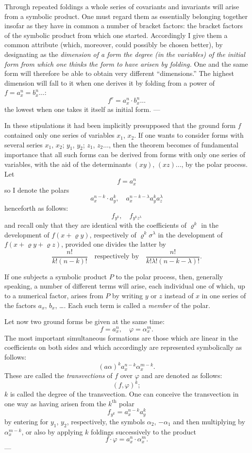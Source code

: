 \documentclass[10pt]{article}
\begin{document}
Through repeated foldings a whole series of covariants and invariants will arise from a symbolic product. One must regard them as essentially belonging together insofar as they have in common a number of bracket factors: the bracket factors of the symbolic product from which one started. Accordingly I give them a common attribute (which, moreover, could possibly be chosen better), by designating as the \emph{dimension of a form the degree (in the variables) of the initial form from which one thinks the form to have arisen by folding.} One and the same form will therefore be able to obtain very different ``dimensions.'' The highest dimension will fall to it when one derives it by folding from a power of $f=a_x^n=b_x^n\ldots$:
\[
f^r=a_x^n\cdot b_x^n\ldots
\]
the lowest when one takes it itself as initial form. ---

In these stipulations it had been implicitly presupposed that the ground form $f$ contained only one series of variables $x_1$, $x_2$. If one wants to consider forms with several series $x_1$, $x_2$; $y_1$, $y_2$; $z_1$, $z_2\ldots$, then the theorem becomes of fundamental importance that all such forms can be derived from forms with only one series of variables, with the aid of the determinants $(xy)$, $(xz)\ldots$, by the polar process. Let
\[
f=a_x^n
\]
so I denote the polars
\[
a_x^{n-k}\cdot a_y^k,\quad a_x^{n-k-\lambda}a_y^k a_z^\lambda
\]
henceforth as follows:
\[
f_{y^k},\quad f_{y^k z^\lambda}
\]
and recall only that they are identical with the coefficients of $\varrho^k$ in the development of $f(x+\varrho y)$, respectively of $\varrho^k\sigma^\lambda$ in the development of $f(x+\varrho y+\varrho z)$, provided one divides the latter by
\[
\frac{n!}{k!(n-k)!}\quad\text{respectively by}\quad \frac{n!}{k!\lambda!(n-k-\lambda)!}.
\]

If one subjects a symbolic product $P$ to the polar process, then, generally speaking, a number of different terms will arise, each individual one of which, up to a numerical factor, arises from $P$ by writing $y$ or $z$ instead of $x$ in one series of the factors $a_x$, $b_x$, \ldots. Each such term is called a \emph{member} of the polar.

Let now two ground forms be given at the same time:
\[
f=a_x^n,\quad \varphi=\alpha_x^m.
\]
The most important simultaneous formations are those which are linear in the coefficients on both sides and which accordingly are represented symbolically as follows:
\[
(a\alpha)^k a_x^{n-k}\alpha_x^{m-k}.
\]
These are called the \emph{transvections} of $f$ over $\varphi$ and are denoted as follows:
\[
(f,\varphi)^k;
\]
$k$ is called the degree of the transvection. One can conceive the transvection in one way as having arisen from the $k^{\mathrm{th}}$ polar
\[
f_{y^k}=a_x^{n-k}a_y^k
\]
by entering for $y_1$, $y_2$, respectively, the symbols $\alpha_2$, $-\alpha_1$ and then multiplying by $\alpha_x^{m-k}$, or also by applying $k$ foldings successively to the product
\[
f\cdot\varphi=a_x^n\cdot \alpha_x^m.
\]
---
\end{document}
